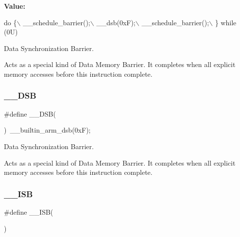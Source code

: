 {\bfseries Value\+:}
\begin{DoxyCode}
\textcolor{keywordflow}{do} \{\(\backslash\)
                   \_\_schedule\_barrier();\(\backslash\)
                   \_\_dsb(0xF);\(\backslash\)
                   \_\_schedule\_barrier();\(\backslash\)
                \} \textcolor{keywordflow}{while} (0U)
\end{DoxyCode}


Data Synchronization Barrier. 

Acts as a special kind of Data Memory Barrier. It completes when all explicit memory accesses before this instruction complete. \mbox{\label{group___c_m_s_i_s___core___instruction_interface_ga067d257a2b34565410acefb5afef2203}} 
\subsubsection{\texorpdfstring{\+\_\+\+\_\+\+D\+SB}{\_\_DSB}\hspace{0.1cm}{\footnotesize\ttfamily [2/2]}}
{\footnotesize\ttfamily \#define \+\_\+\+\_\+\+D\+SB(\begin{DoxyParamCaption}{ }\end{DoxyParamCaption})~\+\_\+\+\_\+builtin\+\_\+arm\+\_\+dsb(0x\+F);}



Data Synchronization Barrier. 

Acts as a special kind of Data Memory Barrier. It completes when all explicit memory accesses before this instruction complete. \mbox{\label{group___c_m_s_i_s___core___instruction_interface_gaad233022e850a009fc6f7602be1182f6}} 
\subsubsection{\texorpdfstring{\+\_\+\+\_\+\+I\+SB}{\_\_ISB}\hspace{0.1cm}{\footnotesize\ttfamily [1/2]}}
{\footnotesize\ttfamily \#define \+\_\+\+\_\+\+I\+SB(\begin{DoxyParamCaption}{ }\end{DoxyParamCaption})}

